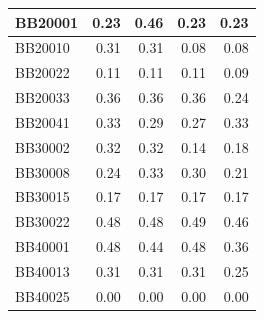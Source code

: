 \begin{table}[!htbp]
\begin{adjustwidth}{-0.6cm}{}
\begin{tabular}{|l|r|r|r|r|}
		\hline
		BB20001 & \cellcolor[rgb]{ .384,  .745,  .478}0.23 & \cellcolor[rgb]{ .988,  1,  .992}0.46 & \cellcolor[rgb]{ .384,  .745,  .478}0.23 & \cellcolor[rgb]{ .384,  .745,  .478}0.23 \\
		\hline
		BB20010 & \cellcolor[rgb]{ .988,  1,  .992}0.31 & \cellcolor[rgb]{ .988,  1,  .992}0.31 & \cellcolor[rgb]{ .384,  .745,  .478}0.08 & \cellcolor[rgb]{ .384,  .745,  .478}0.08 \\
		\hline
		BB20022 & \cellcolor[rgb]{ .988,  1,  .992}0.11 & \cellcolor[rgb]{ .988,  1,  .992}0.11 & \cellcolor[rgb]{ .988,  1,  .992}0.11 & \cellcolor[rgb]{ .384,  .745,  .478}0.09 \\
		\hline
		BB20033 & \cellcolor[rgb]{ .988,  1,  .992}0.36 & \cellcolor[rgb]{ .988,  1,  .992}0.36 & \cellcolor[rgb]{ .988,  1,  .992}0.36 & \cellcolor[rgb]{ .384,  .745,  .478}0.24 \\
		\hline
		BB20041 & \cellcolor[rgb]{ .988,  1,  .992}0.33 & \cellcolor[rgb]{ .584,  .827,  .647}0.29 & \cellcolor[rgb]{ .384,  .745,  .478}0.27 & \cellcolor[rgb]{ .988,  1,  .992}0.33 \\
		\hline
		BB30002 & \cellcolor[rgb]{ .988,  1,  .992}0.32 & \cellcolor[rgb]{ .988,  1,  .992}0.32 & \cellcolor[rgb]{ .384,  .745,  .478}0.14 & \cellcolor[rgb]{ .502,  .792,  .58}0.18 \\
		\hline
		BB30008 & \cellcolor[rgb]{ .533,  .808,  .604}0.24 & \cellcolor[rgb]{ .988,  1,  .992}0.33 & \cellcolor[rgb]{ .835,  .933,  .863}0.30 & \cellcolor[rgb]{ .384,  .745,  .478}0.21 \\
		\hline
		BB30015 & \cellcolor[rgb]{ .988,  1,  .992}0.17 & \cellcolor[rgb]{ .988,  1,  .992}0.17 & \cellcolor[rgb]{ .988,  1,  .992}0.17 & \cellcolor[rgb]{ .988,  1,  .992}0.17 \\
		\hline
		BB30022 & \cellcolor[rgb]{ .682,  .871,  .733}0.48 & \cellcolor[rgb]{ .682,  .871,  .733}0.48 & \cellcolor[rgb]{ .988,  1,  .992}0.49 & \cellcolor[rgb]{ .384,  .745,  .478}0.46 \\
		\hline
		BB40001 & \cellcolor[rgb]{ .988,  1,  .992}0.48 & \cellcolor[rgb]{ .784,  .914,  .82}0.44 & \cellcolor[rgb]{ .988,  1,  .992}0.48 & \cellcolor[rgb]{ .384,  .745,  .478}0.36 \\
		\hline
		BB40013 & \cellcolor[rgb]{ .988,  1,  .992}0.31 & \cellcolor[rgb]{ .988,  1,  .992}0.31 & \cellcolor[rgb]{ .988,  1,  .992}0.31 & \cellcolor[rgb]{ .384,  .745,  .478}0.25 \\
		\hline
		BB40025 & \cellcolor[rgb]{ .988,  1,  .992}0.00 & \cellcolor[rgb]{ .988,  1,  .992}0.00 & \cellcolor[rgb]{ .988,  1,  .992}0.00 & \cellcolor[rgb]{ .988,  1,  .992}0.00 \\

\end{tabular}
\end{adjustwidth}
\end{table}
